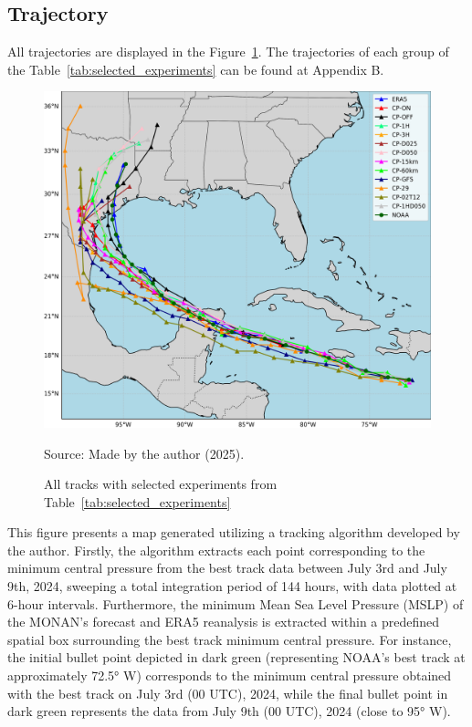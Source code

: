 \subsection{Trajectory}


All trajectories are displayed in the Figure~\ref{fig:all_tracks_selected}. The trajectories of each group of the Table~\ref{tab:selected_experiments} can be found at Appendix B.

\begin{figure}[!ht]
    \centering
    \caption{All tracks with selected experiments from Table~\ref{tab:selected_experiments}} %
    \includegraphics[width=\textwidth]{docs/figuras/chapter5/ALL_tracks_filter.png} 
    \vspace{0.5em}
    
    Source: Made by the author (2025). %
    \label{fig:all_tracks_selected} %
\end{figure}

This figure presents a map generated utilizing a tracking algorithm developed by the author. Firstly, the algorithm extracts each point corresponding to the minimum central pressure from the best track data between July 3rd and July 9th, 2024, sweeping a total integration period of 144 hours, with data plotted at 6-hour intervals. Furthermore, the minimum Mean Sea Level Pressure (MSLP) of the MONAN’s forecast and ERA5 reanalysis is extracted within a predefined spatial box surrounding the best track minimum central pressure. For instance, the initial bullet point depicted in dark green (representing NOAA’s best track at approximately 72.5° W) corresponds to the minimum central pressure obtained with the best track on July 3rd (00 UTC), 2024, while the final bullet point in dark green represents the data from July 9th (00 UTC), 2024 (close to 95° W).

